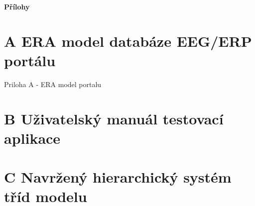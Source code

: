 \documentclass{projekt}
\begin{document}




\appendix
\newpage


\thispagestyle{plain}

\noindent
{\bf \LARGE Přílohy}
\setcounter{chapter}{1}

\newpage
\thispagestyle{plain}
\section*{{\LARGE A} ERA model databáze EEG/ERP portálu}
\hspace{0.65cm}Priloha A - ERA model portalu
\section*{{\LARGE B} Uživatelský manuál testovací aplikace}
\section*{{\LARGE C} Navržený hierarchický systém tříd modelu}
\end{document}

